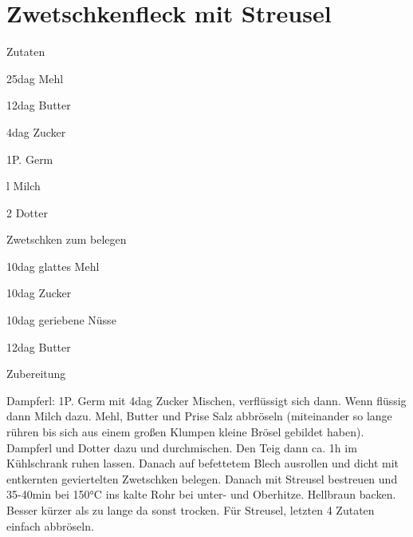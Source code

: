 \chapter*{Zwetschkenfleck mit Streusel}
\begin{multicols}{2}
 {\Large Zutaten}
 \begin{Zutaten}
		\item 25dag Mehl
		\item 12dag Butter
		\item 4dag Zucker
		\item 1P. Germ
		\item {}l Milch
		\item 2 Dotter
		\item Zwetschken zum belegen
		\item 10dag glattes Mehl
		\item 10dag Zucker
		\item 10dag geriebene Nüsse
		\item 12dag Butter
		
		
\end{Zutaten}
	
\columnbreak
{}
\end{multicols}

{\Large Zubereitung} \newline
\begin{addmargin}[1cm]{0cm}
	Dampferl: 1P. Germ mit 4dag Zucker Mischen, verflüssigt sich dann. Wenn flüssig dann Milch dazu.\newline\newline
	Mehl, Butter und Prise Salz abbröseln (miteinander so lange rühren bis sich aus einem großen Klumpen
	kleine Brösel gebildet haben).\newline
	Dampferl und Dotter dazu und durchmischen.
	Den Teig dann ca. 1h im Kühlschrank ruhen lassen.\newline
	Danach auf befettetem Blech ausrollen und dicht mit entkernten geviertelten Zwetschken belegen.\newline
	Danach mit Streusel bestreuen und 35-40min bei 150°C ins kalte Rohr bei unter- und Oberhitze.\newline
	Hellbraun backen. Besser kürzer als zu lange da sonst trocken.
	Für Streusel, letzten 4 Zutaten einfach abbröseln.\newline
	
\end{addmargin}
